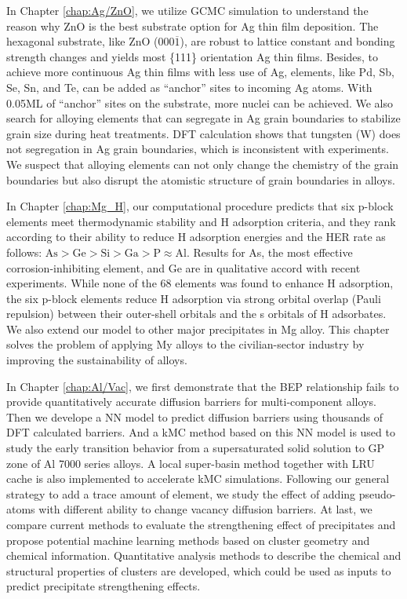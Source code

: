 In Chapter \ref{chap:Ag/ZnO}, we utilize \ac{GCMC} simulation to understand the reason why ZnO is the best substrate option for Ag thin film deposition. The hexagonal substrate, like ZnO (000$\overline{1}$), are robust to lattice constant and bonding strength changes and yields most \{111\} orientation Ag thin films. Besides, to achieve more continuous Ag thin films with less use of Ag, elements, like Pd, Sb, Se, Sn, and Te, can be added as ``anchor'' sites to incoming Ag atoms. With 0.05\ac{ML} of ``anchor'' sites on the substrate, more nuclei can be achieved. We also search for alloying elements that can segregate in Ag grain boundaries to stabilize grain size during heat treatments. \ac{DFT} calculation shows that tungsten (W) does not segregation in Ag grain boundaries, which is inconsistent with experiments. We suspect that alloying elements can not only change the chemistry of the grain boundaries but also disrupt the atomistic structure of grain boundaries in alloys.

In Chapter \ref{chap:Mg_H}, our computational procedure predicts that six p-block elements meet thermodynamic stability and H adsorption criteria, and they rank according to their ability to reduce H adsorption energies and the \ac{HER} rate as follows: $\text{As} > \text{Ge} > \text{Si} > \text{Ga} > \text{P} \approx \text{Al}$. Results for As, the most effective corrosion-inhibiting element, and Ge are in qualitative accord with recent experiments. While none of the 68 elements was found to enhance H adsorption, the six p-block elements reduce H adsorption via strong orbital overlap (Pauli repulsion) between their outer-shell orbitals and the s orbitals of H adsorbates. We also extend our model to other major precipitates in Mg alloy. This chapter solves the problem of applying My alloys to the civilian-sector industry by improving the sustainability of alloys.

In Chapter \ref{chap:Al/Vac}, we first demonstrate that the \acf{BEP} relationship fails to provide quantitatively accurate diffusion barriers for multi-component alloys. Then we develope a \ac{NN} model to predict diffusion barriers using thousands of \ac{DFT} calculated barriers. And a \ac{kMC} method based on this \ac{NN} model is used to study the early transition behavior from a supersaturated solid solution to \ac{GP} zone of Al 7000 series alloys. A local super-basin method together with \ac{LRU} cache is also implemented to accelerate \ac{kMC} simulations. Following our general strategy to add a trace amount of element, we study the effect of adding pseudo-atoms with different ability to change vacancy diffusion barriers. At last, we compare current methods to evaluate the strengthening effect of precipitates and propose potential machine learning methods based on cluster geometry and chemical information. Quantitative analysis methods to describe the chemical and structural properties of clusters are developed, which could be used as inputs to predict precipitate strengthening effects.



